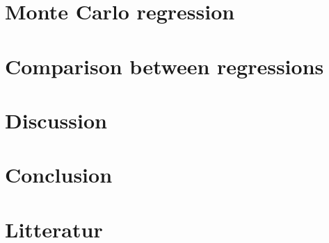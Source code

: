 \documentclass{article}
\begin{document}
	\section{Monte Carlo regression}
	\newpage
	
	\section{Comparison between regressions}
	\newpage
	
	\section{Discussion}
	\newpage
	
	\section{Conclusion}
	\newpage
	
 	\section{Litteratur}
  
\end{document}
